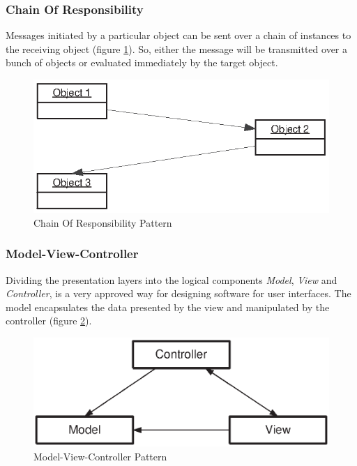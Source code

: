 \subsubsection{Chain Of Responsibility}
\label{chain_of_responsibility_heading}

Messages initiated by a particular object can be sent over a chain of instances
to the receiving object (figure \ref{chain_of_responsibility_figure}). So, either
the message will be transmitted over a bunch of objects or evaluated immediately
by the target object.

\begin{figure}[ht]
    \begin{center}
       \includegraphics[scale=0.8]{eps/chain.eps}
       \caption{Chain Of Responsibility Pattern}
       \label{chain_of_responsibility_figure}
    \end{center}
\end{figure}

\subsubsection{Model-View-Controller}
\label{model_view_controller_heading}

Dividing the presentation layers into the logical components \emph{Model},
\emph{View} and \emph{Controller}, is a very approved way for designing software
for user interfaces. The model encapsulates the data presented by the view and
manipulated by the controller (figure \ref{model_view_controller_figure}).

\begin{figure}[ht]
    \begin{center}
       \includegraphics[scale=0.6]{eps/mvc-1.eps}
       \caption{Model-View-Controller Pattern}
       \label{model_view_controller_figure}
    \end{center}
\end{figure}

